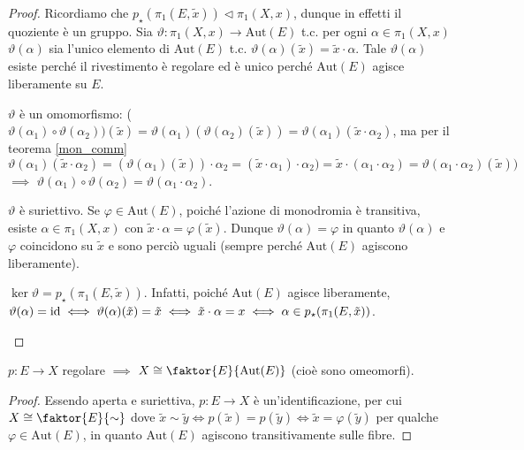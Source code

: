 \begin{proof}
  Ricordiamo che $p_{\star}(\pi_1(E, \tilde{x})) \vartriangleleft \pi_1(X, x)$, dunque in effetti il quoziente è un gruppo.
  Sia $\vartheta:\pi_1(X, x) \rightarrow \text{Aut}(E)$ t.c. per ogni $\alpha \in \pi_1(X, x)$ $\vartheta(\alpha)$ sia l'unico elemento di $\text{Aut}(E)$ t.c. $\vartheta(\alpha)(\tilde{x})=\tilde{x} \cdot \alpha$.
  Tale $\vartheta(\alpha)$ esiste perché il rivestimento è regolare ed è unico perché $\text{Aut}(E)$ agisce liberamente su $E$.
  \begin{nlist}
    \item $\vartheta$ è un omomorfismo: ($\vartheta(\alpha_1) \circ \vartheta(\alpha_2))(\tilde{x})=\vartheta(\alpha_1)(\vartheta(\alpha_2)(\tilde{x}))=\vartheta(\alpha_1)(\tilde{x} \cdot \alpha_2)$,
    ma per il teorema \ref{mon_comm} $\vartheta(\alpha_1)(\tilde{x} \cdot \alpha_2)=(\vartheta(\alpha_1)(\tilde{x}))\cdot\alpha_2=(\tilde{x}\cdot\alpha_1)\cdot\alpha_2)=\tilde{x}\cdot(\alpha_1\cdot\alpha_2)=\vartheta(\alpha_1 \cdot \alpha_2)(\tilde{x}))$
    $\implies$ $\vartheta(\alpha_1)\circ\vartheta(\alpha_2)=\vartheta(\alpha_1 \cdot \alpha_2)$.
    \item $\vartheta$ è suriettivo. Se $\varphi \in \text{Aut}(E)$, poiché l'azione di monodromia è transitiva, esiste $\alpha \in \pi_1(X, x)$ con $\tilde{x} \cdot \alpha=\varphi(\tilde{x})$. Dunque $\vartheta(\alpha)=\varphi$ in quanto $\vartheta(\alpha)$ e $\varphi$ coincidono su $\tilde{x}$ e sono perciò uguali (sempre perché $\text{Aut}(E)$ agiscono liberamente).
    \item $\ker{\vartheta}=p_{\star}(\pi_1(E, \tilde{x}))$. Infatti, poiché $\text{Aut}(E)$ agisce liberamente, $\vartheta(\alpha)=\operatorname{id} \iff \vartheta(\alpha)(\tilde{x})=\tilde{x} \iff \tilde{x} \cdot \alpha=x \iff \alpha \in p_{\star}(\pi_1(E, \tilde{x}))$.
  \end{nlist}
\end{proof}

\begin{cor}
  $p:E \rightarrow X$ regolare $\implies$ $X \cong \faktor{E}{\text{Aut}(E)}$ (cioè sono omeomorfi).
\end{cor}

\begin{proof}
  Essendo aperta e suriettiva, $p:E \rightarrow X$ è un'identificazione, per cui $X \cong \faktor{E}{\sim}$ dove $\tilde{x} \sim \tilde{y} \iff p(\tilde{x})=p(\tilde{y}) \iff \tilde{x}=\varphi(\tilde{y})$ per qualche $\varphi \in \text{Aut}(E)$, in quanto $\text{Aut}(E)$ agiscono transitivamente sulle fibre.
\end{proof}

